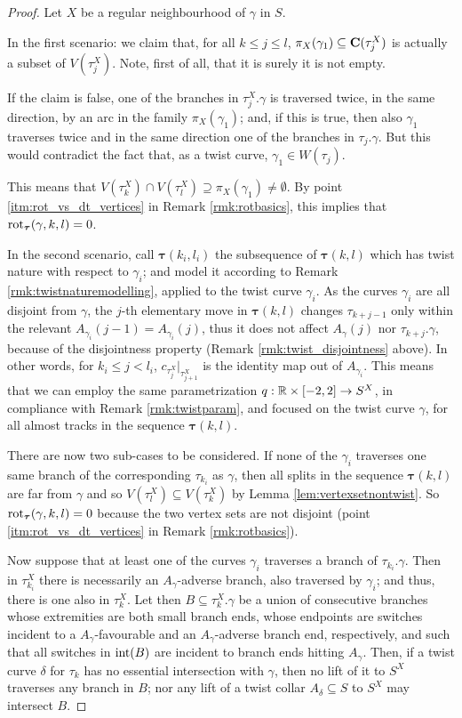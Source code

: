 \begin{proof}
Let $X$ be a regular neighbourhood of $\gamma$ in $S$.

In the first scenario: we claim that, for all $k\leq j\leq l$, $\pi_X(\gamma_1)\subseteq \mathbf C(\tau_j^X)$ is actually a subset of $V(\tau_j^X)$. Note, first of all, that it is surely it is not empty.

If the claim is false, one of the branches in $\tau_j^{X}.\gamma$ is traversed twice, in the same direction, by an arc in the family $\pi_{X}(\gamma_1)$; and, if this is true, then also $\gamma_1$ traverses twice and in the same direction one of the branches in $\tau_j.\gamma$. But this would contradict the fact that, as a twist curve, $\gamma_1\in W(\tau_j)$.

This means that $V(\tau_k^{X})\cap V(\tau_l^{X})\supseteq \pi_{X}(\gamma_1)\not=\emptyset$. By point \ref{itm:rot_vs_dt_vertices} in Remark \ref{rmk:rotbasics}, this implies that $\mathrm{rot}_{\bm\tau}(\gamma,k,l)=0$.

In the second scenario, call $\bm\tau(k_i,l_i)$ the subsequence of $\bm\tau(k,l)$ which has twist nature with respect to $\gamma_i$; and model it according to Remark \ref{rmk:twistnaturemodelling}, applied to the twist curve $\gamma_i$. As the curves $\gamma_i$ are all disjoint from $\gamma$, the $j$-th elementary move in $\bm\tau(k,l)$ changes $\tau_{k+j-1}$ only within the relevant $A_{\gamma_i}(j-1)=A_{\gamma_i}(j)$, thus it does not affect $A_\gamma(j)$ nor $\tau_{k+j}.\gamma$, because of the disjointness property (Remark \ref{rmk:twist_disjointness} above). In other words, for $k_i\leq j < l_i$, $c_{\tau_j^X}|_{\tau_{j+1}^X}$ is the identity map out of $A_{\gamma_i}$. This means that we can employ the same parametrization $q:\mathbb R\times[-2,2]\rightarrow S^X$, in compliance with Remark \ref{rmk:twistparam}, and focused on the twist curve $\gamma$, for all almost tracks in the sequence $\bm\tau(k,l)$.

There are now two sub-cases to be considered. If none of the $\gamma_i$ traverses one same branch of the corresponding $\tau_{k_i}$ as $\gamma$, then all splits in the sequence $\bm\tau(k,l)$ are far from $\gamma$ and so $V(\tau_l^X)\subseteq V(\tau_k^X)$ by Lemma \ref{lem:vertexsetnontwist}. So $\mathrm{rot}_{\bm\tau}(\gamma,k,l)=0$ because the two vertex sets are not disjoint (point \ref{itm:rot_vs_dt_vertices} in Remark \ref{rmk:rotbasics}).

Now suppose that at least one of the curves $\gamma_i$ traverses a branch of $\tau_{k_i}.\gamma$. Then in $\tau_{k_i}^X$ there is necessarily an $A_\gamma$-adverse branch, also traversed by $\gamma_i$; and thus, there is one also in $\tau_k^{X}$. Let then $B\subseteq \tau_k^X.\gamma$ be a union of consecutive branches whose extremities are both small branch ends, whose endpoints are switches incident to a $A_\gamma$-favourable and an $A_\gamma$-adverse branch end, respectively, and such that all switches in $\mathrm{int}(B)$ are incident to branch ends hitting $A_\gamma$. Then, if a twist curve $\delta$ for $\tau_k$ has no essential intersection with $\gamma$, then no lift of it to $S^X$ traverses any branch in $B$; nor any lift of a twist collar $A_\delta\subseteq S$ to $S^X$ may intersect $B$.


\end{proof}

